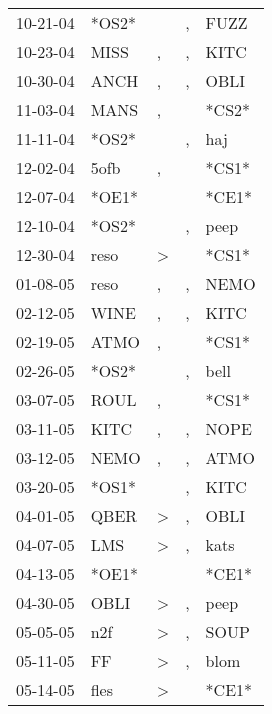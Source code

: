 \begin{supertabular}{lllll}
 10-21-04 &  *OS2* &                  &                , &   FUZZ \\
 10-23-04 &   MISS &                , &                , &   KITC \\
 10-30-04 &   ANCH &                , &                , &   OBLI \\
 11-03-04 &   MANS &                , &                  &  *CS2* \\
 11-11-04 &  *OS2* &                  &                , &    haj \\
 12-02-04 &   5ofb &                , &                  &  *CS1* \\
 12-07-04 &  *OE1* &                  &                  &  *CE1* \\
 12-10-04 &  *OS2* &                  &                , &   peep \\
 12-30-04 &   reso &     \textgreater &                  &  *CS1* \\
 01-08-05 &   reso &                , &                , &   NEMO \\
 02-12-05 &   WINE &                , &                , &   KITC \\
 02-19-05 &   ATMO &                , &                  &  *CS1* \\
 02-26-05 &  *OS2* &                  &                , &   bell \\
 03-07-05 &   ROUL &                , &                  &  *CS1* \\
 03-11-05 &   KITC &                , &                , &   NOPE \\
 03-12-05 &   NEMO &                , &                , &   ATMO \\
 03-20-05 &  *OS1* &                  &                , &   KITC \\
 04-01-05 &   QBER &     \textgreater &                , &   OBLI \\
 04-07-05 &    LMS &     \textgreater &                , &   kats \\
 04-13-05 &  *OE1* &                  &                  &  *CE1* \\
 04-30-05 &   OBLI &     \textgreater &                , &   peep \\
 05-05-05 &    n2f &     \textgreater &                , &   SOUP \\
 05-11-05 &     FF &     \textgreater &                , &   blom \\
 05-14-05 &   fles &     \textgreater &                  &  *CE1* \\

\end{supertabular}
